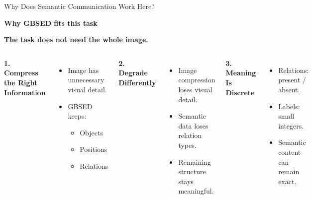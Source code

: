 \documentclass[aspectratio=169]{beamer}
\begin{document}
\begin{frame}{Why Does Semantic Communication Work Here?}

\noindent
\begin{center}
\textbf{\large Why GBSED fits this task}
\end{center}

\begin{center}
\textbf{The task does not need the whole image.}
\end{center}

\vspace{0.25cm}

\begin{columns}[T]

\small
\textbf{ 1. Compress the Right Information}

\begin{itemize}
    \item Image has unnecessary visual detail.
    \item GBSED keeps:
    \begin{itemize}
        \item Objects
        \item Positions
        \item Relations
    \end{itemize}
\end{itemize}


\small
\textbf{ 2. Degrade Differently}

\begin{itemize}
    \item Image compression loses visual detail.
    \item Semantic data loses relation types.
    \item Remaining structure stays meaningful.
\end{itemize}


\small
\textbf{ 3. Meaning Is Discrete}

\begin{itemize}
    \item Relations: present / absent.
    \item Labels: small integers.
    \item Semantic content can remain exact.
\end{itemize}

\end{columns}
\end{frame}
\end{document}
